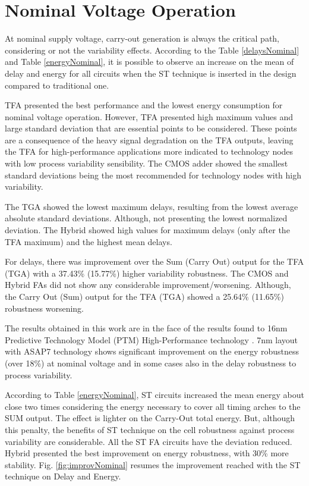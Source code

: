 \documentclass[ecp,tc, english]{iiufrgs}
\begin{document}
\section{Nominal Voltage Operation}

At nominal supply voltage, carry-out generation is always the critical path, considering or not the variability effects. According to the Table \ref{delaysNominal} and Table \ref{energyNominal}, it is possible to observe an increase on the mean of delay and energy for all circuits when the ST technique is inserted in the design compared to traditional one.

TFA presented the best performance and the lowest energy consumption for nominal voltage operation. However, TFA presented high maximum values and large standard deviation that are essential points to be considered. These points are a consequence of the heavy signal degradation on the TFA outputs, leaving the TFA for high-performance applications more indicated to technology nodes with low process variability sensibility. The CMOS adder showed the smallest standard deviations being the most recommended for technology nodes with high variability. 

The TGA showed the lowest maximum delays, resulting from the lowest average absolute standard deviations. Although, not presenting the lowest normalized deviation. The Hybrid showed high values for maximum delays (only after the TFA maximum) and the highest mean delays.   

For delays, there was improvement over the Sum (Carry Out) output for the TFA (TGA) with a 37.43\% (15.77\%) higher variability robustness. The CMOS and Hybrid FAs did not show any considerable improvement/worsening. Although, the Carry Out (Sum) output for the TFA (TGA) showed a 25.64\% (11.65\%) robustness worsening.

The results obtained in this work are in the face of the results found to 16nm Predictive Technology Model (PTM) High-Performance technology \cite{samuel2016}. 7nm layout with ASAP7 technology shows significant improvement on the energy robustness (over 18\%) at nominal voltage and in some cases also in the delay robustness to process variability. 

According to Table \ref{energyNominal}, ST circuits increased the mean energy about close two times considering the energy necessary to cover all timing arches to the SUM output. The effect is lighter on the Carry-Out total energy. But, although this penalty, the benefits of ST technique on the cell robustness against process variability are considerable. All the ST FA circuits have the deviation reduced. Hybrid presented the best improvement on energy robustness, with 30\% more stability. Fig. \ref{fig:improvNominal} resumes the improvement reached with the ST technique on Delay and Energy.
\end{document}

